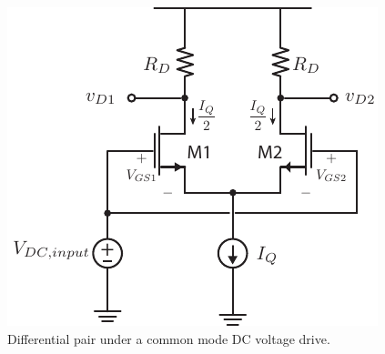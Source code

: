 \begin{figure}[tb]
\begin{center}
\includegraphics[scale=1]{diffamp_cm_dc.pdf}
\end{center}
\caption{Differential pair under a common mode DC voltage drive.} \label{fig:diffamp_cm_dc.pdf}
\end{figure}

